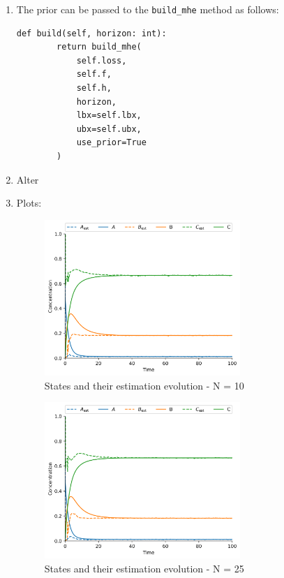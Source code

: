 \documentclass[]{article}
\begin{document}
\begin{enumerate}
	\item The prior can be passed to the \texttt{build\_mhe} method as follows:
	\begin{lstlisting}[style=python]
	def build(self, horizon: int):
        return build_mhe(
            self.loss,
            self.f,
            self.h,
            horizon,
            lbx=self.lbx,
            ubx=self.ubx,
            use_prior=True
        )
	\end{lstlisting}
	
	\item Alter
	
	\item Plots:
	\begin{figure}[H]
		\centering
		\includegraphics[width=0.7\textwidth]{images/Assignment5_N=10_False.png}
		\caption{States and their estimation evolution - N = 10}
		\label{fig:assignment51_2}
	\end{figure}
	\begin{figure}[H]
		\centering
		\includegraphics[width=0.7\textwidth]{images/Assignment5_N=25_False.png}
		\caption{States and their estimation evolution - N = 25}
		\label{fig:assignment51_1}
	\end{figure}
	

\end{enumerate}
\end{document}
